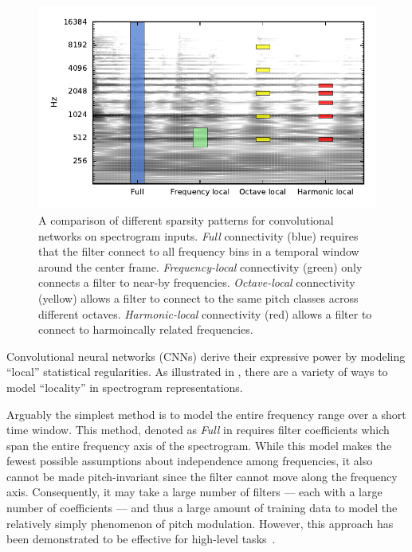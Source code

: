 \documentclass{article}
\begin{document}
\begin{figure}
    \includegraphics[width=\columnwidth]{figs/filter-shapes}
    \caption{A comparison of different sparsity patterns for convolutional networks on spectrogram inputs.
        \emph{Full} connectivity (blue) requires that the filter connect to all frequency bins in a temporal window around the center frame.
        \emph{Frequency-local} connectivity (green) only connects a filter to near-by frequencies.
        \emph{Octave-local} connectivity (yellow) allows a filter to connect to the same pitch classes across different octaves.
        \emph{Harmonic-local} connectivity (red) allows a filter to connect to harmoincally related frequencies.}
\label{figs:filter-shapes}
\end{figure}
Convolutional neural networks (CNNs) derive their expressive power by modeling ``local'' statistical regularities.
As illustrated in , there are a variety of ways to model ``locality'' in spectrogram representations.

Arguably the simplest method is to model the entire frequency range over a short time window.  
This method, denoted as \emph{Full} in  requires filter coefficients which span the entire frequency axis of the spectrogram.
While this model makes the fewest possible assumptions about independence among frequencies, it also cannot be made pitch-invariant since the filter cannot move along the frequency axis.
Consequently, it may take a large number of filters --- each with a large number of coefficients --- and thus a large amount of training data to model the relatively simply phenomenon of pitch modulation.
However, this approach has been demonstrated to be effective for high-level tasks~\cite{van2013deep}.
\end{document}
